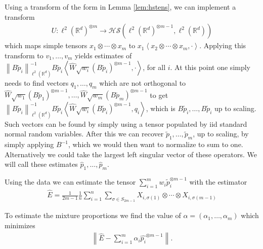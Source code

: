 \documentclass[aos,preprint]{imsart}
\def\rn{\mathbb{R}}
\def\l{\left}
\def\r{\right}
\def\hs{\mathscr{HS}}
\def\lrd{{\ell^2\left( \rn^d \right)}}
\theoremstyle{plain}
\theoremstyle{defintion}
\begin{document}
	Using a transform of the form in Lemma \ref{lem:hstens}, we can implement a transform 
	\begin{align*}
		U: \lrd^{\otimes m} \to \hs \left( \lrd^{\otimes m-1}, \lrd  \right)
	\end{align*}
	which maps simple tensors $x_1\otimes \cdots \otimes x_m$ to $x_1 \l<x_2 \otimes \cdots \otimes x_m, \cdot \r>$. Applying this transform to $v_1,\ldots,v_m$ yields estimates of $\l\|B\tilde{p}_i\r\|_\lrd^{-1}B \tilde{p}_i \l< \widehat{W} \sqrt{w_i} \left( B\tilde{p}_i \right)^{\otimes m-1},\cdot\r>$, for all $i$.
        At this point one simply needs to find vectors $q_1,\ldots,q_m$ which are not orthogonal to $\widehat{W} \sqrt{w_1} \left( B\tilde{p}_1 \right)^{\otimes m-1},\ldots,\widehat{W} \sqrt{w_m} \left( B\tilde{p}_m \right)^{\otimes m-1}$ to get $\l\|B\tilde{p}_i\r\|_\lrd^{-1}B \tilde{p}_i \l< \widehat{W} \sqrt{w_i} \left( B\tilde{p}_i \right)^{\otimes m-1},q_i\r>$, which is $B\tilde{p}_i,\ldots, B\tilde{p}_i$ up to scaling. Such vectors can be found by simply using a tensor populated by iid standard normal random variables. After this we can recover $\tilde{p}_1,\ldots,\tilde{p}_m$, up to scaling, by simply applying $B^{-1}$, which we would then want to normalize to sum to one. Alternatively we could take the largest left singular vector of these operators. We will call these estimates $\widehat{p}_1,\ldots,\widehat{p}_m$.

	Using the data we can estimate the tensor 
        $\sum_{i=1}^m w_i \tilde{p}_i^{\otimes m-1}$ with the estimator
	\begin{eqnarray*}
		\widehat{E} = \frac{1}{2m-1} \frac{1}{n} \sum_{i=1}^n \sum_{\sigma \in S_{2m-1}} X_{i,\sigma\left( 1 \right)} \otimes \cdots \otimes X_{i,\sigma\left( m-1 \right)}
	\end{eqnarray*}

	To estimate the mixture proportions we find the value of $\alpha = \left( \alpha_1,\ldots, \alpha_m \right)$ which minimizes
	\begin{eqnarray*}
		\l\|\widehat{E} - \sum_{i=1}^m \alpha_i \widehat{p_i}^{\otimes m-1}\r\|.
	\end{eqnarray*}
\end{document}
